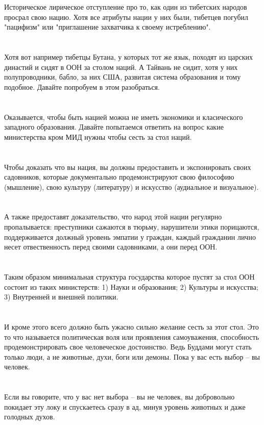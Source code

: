 Историческое лирическое отступление про то, как один из тибетских народов просрал свою нацию. Хотя все атрибуты нации у них были, тибетцев погубил "пацифизм" или "приглашение захватчика к своему истреблению".\\
\\
\\
Хотя вот например тибетцы Бутана, у которых тот же язык, походят из царских династий и сидят в ООН за столом наций. А Тайвань не сидит, хотя у них полупроводники, бабло, за них США, развитая система образования и тому подобное. Давайте попробуем в этом разобраться.\\
\\
\\
Оказывается, чтобы быть нацией можна не иметь экономики и класического западного образования. Давайте попытаемся ответить на вопрос какие министерства кром МИД нужны чтобы сесть за стол наций.\\
\\
\\
Чтобы доказать что вы нация, вы должны предоставить и экспонировать своих садовников, которые документально продемонстрируют свою философию (мышление), свою культуру (литературу) и искусство (аудиальное и визуальное).\\
\\
\\
А также предоставят доказательство, что народ этой нации регулярно пропалывается: преступники сажаются в тюрьму, нарушители этики порицаются, поддерживается должный уровень эмпатии у граждан, каждый гражданин лично несет отвественность перед своими садовниками, а они перед ООН.\\
\\
\\
Таким образом минимальная структура государства которое пустят за стол ООН состоит из таких министерств: 1) Науки и образования; 2) Культуры и искусства; 3) Внутренней и внешней политики.\\
\\
\\
И кроме этого всего должно быть ужасно сильно желание сесть за этот стол. Это то что называется политическая воля или проявления самоуважения, способность продемонстрировать свое человеческое достоинство. Ведь Буддами могут стать только люди, а не животные, духи, боги или демоны. Пока у вас есть выбор -- вы человек.\\
\\
\\
Если вы говорите, что у вас нет выбора -- вы не человек, вы добровольно покидает эту локу и спускаетесь сразу в ад, минуя уровень животных и даже голодных духов.\\

